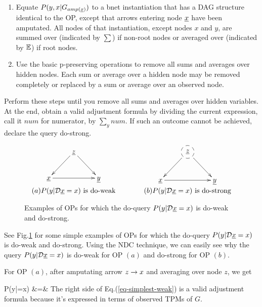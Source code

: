 \begin{mybluearea}

\begin{enumerate}
\item 
Equate $P(y, x| G_{amp(\rvx)})$
to a bnet instantiation
that has a DAG structure identical
to the OP,
except that arrows entering node
$\rvx$ have been amputated.
All nodes  of that instantiation, except
nodes  $x$ and $y$,
are summed over (indicated by $\sum$) if non-root nodes or averaged over
(indicated by ${ \mathbb{E}}$) if root nodes.



\item Use the basic p-preserving operations to
remove all sums and averages over hidden nodes.
Each sum or average over a hidden node may be 
removed completely or replaced by a sum or average over an observed node. 
\end{enumerate}
Perform these steps until you remove all sums and averages  over hidden variables. 
At the end, 
obtain a valid adjustment formula
by dividing 
the current expression, call it $num$ for numerator, by
$\sum_y num$.
If such an outcome cannot be achieved,
declare the  query do-strong.

\end{mybluearea}


\begin{figure}[h!]
$$
\begin{array}{ccc}
\xymatrix{
&\rvz\ar[ld]\ar[rd]
\\
\rvx\ar[rr]&&\rvy
}
&\quad\quad&
\xymatrix{
&*++[F-o]{\rvz}\ar[ld]\ar[rd]
\\
\rvx\ar[rr]&&\rvy
}
\\
(a) \text{$P(y|\cald\rvx=x)$ is do-weak}
&&(b) \text{$P(y|\cald\rvx=x)$ is do-strong}
\end{array}
$$
\caption{Examples of
OPs for which
the do-query $P(y|\cald\rvx=x)$
is
do-weak
and do-strong.
}
\label{fig-iden-noniden}
\end{figure}
See Fig.\ref{fig-iden-noniden}
for some simple
examples of OPs
 for which
the do-query $P(y|\cald\rvx=x)$
is
do-weak
and do-strong.
Using the NDC technique,
we can easily see why the
query $P(y|\cald\rvx=x)$
is do-weak
for OP $(a)$ 
and do-strong for OP $(b)$.

For OP $(a)$, after amputating arrow
$z\rightarrow x$ and averaging over node $z$,
we get

\beqa
P(y|\cald\rvx=x)
&=&
\bcen
{}\ecen
\label{eq-simplest-weak}
\eeqa
The right
side of Eq.(\ref{eq-simplest-weak})
is a valid
adjustment formula
because it's expressed in terms
of observed TPMs of $G$.

